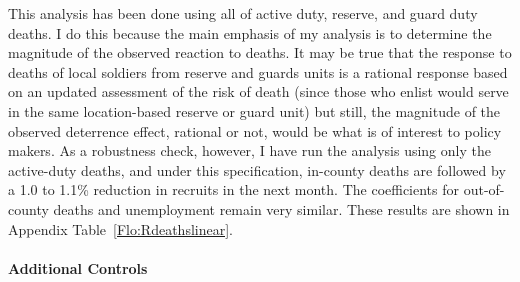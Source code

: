 \documentclass[12pt] {article}
\begin{document}
This analysis has been done using all of active duty, reserve, and
guard duty deaths. I do this because the main emphasis of my analysis
is to determine the magnitude of the observed reaction to deaths.
It may be true that the response to deaths of local soldiers from
reserve and guards units is a rational response based on an updated
assessment of the risk of death (since those who enlist would serve in the same location-based reserve or guard unit) but still, the magnitude of the observed
deterrence effect, rational or not, would be what is of interest to
policy makers. As a robustness check, however, I have run the analysis
using only the active-duty deaths, and under this specification, in-county
deaths are followed by a 1.0 to 1.1\% reduction in recruits in the
next month. The coefficients for out-of-county deaths and unemployment
remain very similar. These results are shown in Appendix Table~\ref{Flo:Rdeathslinear}. 

\paragraph{Additional Controls}
\end{document}
